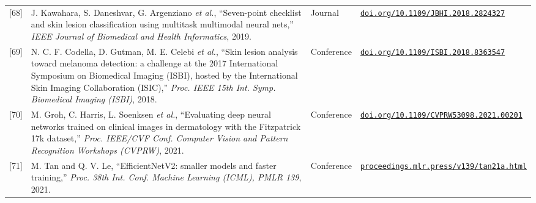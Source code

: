 \documentclass[10pt,a4paper]{article}
\begin{document}
{\begin{longtable}{@{}r L{9.6cm} l L{4.3cm}@{}}
{[68]} & J. Kawahara, S. Daneshvar, G. Argenziano \emph{et al.}, ``Seven-point checklist and skin lesion classification using multitask multimodal neural nets,'' \emph{IEEE Journal of Biomedical and Health Informatics}, 2019. & Journal & \href{https://doi.org/10.1109/JBHI.2018.2824327}{\nolinkurl{doi.org/10.1109/JBHI.2018.2824327}} \\
{[69]} & N. C. F. Codella, D. Gutman, M. E. Celebi \emph{et al.}, ``Skin lesion analysis toward melanoma detection: a challenge at the 2017 International Symposium on Biomedical Imaging (ISBI), hosted by the International Skin Imaging Collaboration (ISIC),'' \emph{Proc. IEEE 15th Int. Symp. Biomedical Imaging (ISBI)}, 2018. & Conference & \href{https://doi.org/10.1109/ISBI.2018.8363547}{\nolinkurl{doi.org/10.1109/ISBI.2018.8363547}} \\
{[70]} & M. Groh, C. Harris, L. Soenksen \emph{et al.}, ``Evaluating deep neural networks trained on clinical images in dermatology with the Fitzpatrick 17k dataset,'' \emph{Proc. IEEE/CVF Conf. Computer Vision and Pattern Recognition Workshops (CVPRW)}, 2021. & Conference & \href{https://doi.org/10.1109/CVPRW53098.2021.00201}{\nolinkurl{doi.org/10.1109/CVPRW53098.2021.00201}} \\
{[71]} & M. Tan and Q. V. Le, ``EfficientNetV2: smaller models and faster training,'' \emph{Proc. 38th Int. Conf. Machine Learning (ICML), PMLR 139}, 2021. & Conference & \href{https://proceedings.mlr.press/v139/tan21a.html}{\nolinkurl{proceedings.mlr.press/v139/tan21a.html}} \\
\bottomrule
\end{longtable}
}
\end{document}
